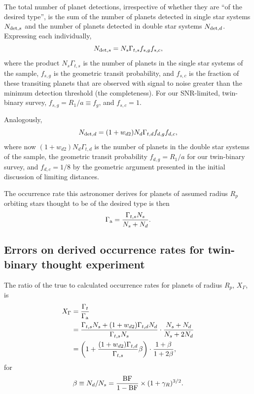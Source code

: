 \documentclass{emulateapj}
\begin{document}
The total number of planet detections, irrespective of whether they are ``of 
the desired type'', is the sum of the number of planets 
detected in single star systems $N_{{\rm det},s}$ and the number of planets 
detected in double star systems $N_{{\rm det},d}$.
Expressing each individually,
\begin{equation}
N_{{\rm det},s} = N_s \Gamma_{t,s} f_{s,g} f_{s,c},
\label{eq:N_det_s}
\end{equation}
where the product $N_s \Gamma_{t,s}$ is the number of planets in the single 
star systems of the sample, $f_{s,g}$ is the geometric transit probability, 
and $f_{s,c}$ is the fraction of these transiting planets that are observed 
with signal to noise greater than the minimum detection threshold (the 
completeness). 
For our SNR-limited, twin-binary survey, $f_{s,g} = R_1/a\equiv f_g$, and 
$f_{s,c}=1$.

Analogously,
\begin{equation}
N_{{\rm det},d} = (1+w_{d2}) N_d \Gamma_{t,d} f_{d,g} f_{d,c},
\label{eq:N_det_d}
\end{equation}
where now $(1+w_{d2}) N_d \Gamma_{t,d}$ is the number of planets in the double 
star systems of the sample, the geometric transit probability $f_{d,g}=R_1/a$ 
for our twin-binary survey, and $f_{d,c}=1/8$ by the geometric argument 
presented in the initial discussion of limiting distances.

The occurrence rate this astronomer derives for planets of assumed 
radius $R_p$ orbiting stars thought to be of the desired type is then
\begin{equation}
\Gamma_{\rm a} = \frac{\Gamma_{t,s}N_s}{N_s + N_d}.
\end{equation}


\subsection{Errors on derived occurrence rates for twin-binary thought 
experiment}
The ratio of the true to calculated occurrence rates for planets of radius 
$R_p$, $X_\Gamma$, is
\begin{align}
X_\Gamma &=
\frac{\Gamma_t}{\Gamma_{\rm a}} \\
&=
\frac{\Gamma_{t,s}N_s + (1+w_{d2})\Gamma_{t,d}N_d}{\Gamma_{t,s} N_s } \cdot 
\frac{N_s + N_d}{N_s + 2N_d} \\
&= 
\left( 
1 + \frac{(1+w_{d2}) \Gamma_{t,d}}{\Gamma_{t,s}} \beta
\right) \cdot 
\frac{1+\beta}{1+2\beta},
\end{align}
for
\begin{equation}
\beta \equiv N_d/N_s = \frac{\rm BF}{1- {\rm BF}} \times (1+\gamma_R)^{3/2}.
\end{equation}
\end{document}
